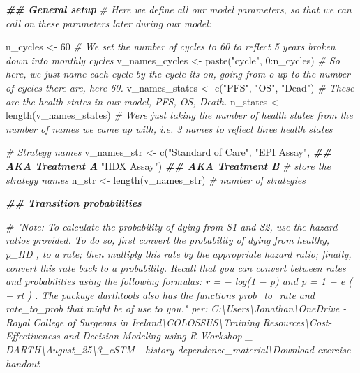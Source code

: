 \documentclass[
]{article}
\newenvironment{Shaded}{\begin{snugshade}}{\end{snugshade}}
\newcommand{\CommentTok}[1]{\textcolor[rgb]{0.56,0.35,0.01}{\textit{#1}}}
\newcommand{\DecValTok}[1]{\textcolor[rgb]{0.00,0.00,0.81}{#1}}
\newcommand{\DocumentationTok}[1]{\textcolor[rgb]{0.56,0.35,0.01}{\textbf{\textit{#1}}}}
\newcommand{\FunctionTok}[1]{\textcolor[rgb]{0.00,0.00,0.00}{#1}}
\newcommand{\NormalTok}[1]{#1}
\newcommand{\OtherTok}[1]{\textcolor[rgb]{0.56,0.35,0.01}{#1}}
\newcommand{\SpecialCharTok}[1]{\textcolor[rgb]{0.00,0.00,0.00}{#1}}
\newcommand{\StringTok}[1]{\textcolor[rgb]{0.31,0.60,0.02}{#1}}
\begin{document}
\begin{Shaded}
\begin{Highlighting}[]
\DocumentationTok{\#\# General setup}
\CommentTok{\# Here we define all our model parameters, so that we can call on these parameters later during our model:}

\NormalTok{n\_cycles        }\OtherTok{\textless{}{-}} \DecValTok{60}                            
\CommentTok{\# We set the number of cycles to 60 to reflect 5 years broken down into monthly cycles}
\NormalTok{v\_names\_cycles  }\OtherTok{\textless{}{-}} \FunctionTok{paste}\NormalTok{(}\StringTok{"cycle"}\NormalTok{, }\DecValTok{0}\SpecialCharTok{:}\NormalTok{n\_cycles)    }
\CommentTok{\# So here, we just name each cycle by the cycle its on, going from o up to the number of cycles there are, here 60.}
\NormalTok{v\_names\_states  }\OtherTok{\textless{}{-}} \FunctionTok{c}\NormalTok{(}\StringTok{"PFS"}\NormalTok{, }\StringTok{"OS"}\NormalTok{, }\StringTok{"Dead"}\NormalTok{)  }
\CommentTok{\# These are the health states in our model, PFS, OS, Death.}
\NormalTok{n\_states        }\OtherTok{\textless{}{-}} \FunctionTok{length}\NormalTok{(v\_names\_states)        }
\CommentTok{\# We\textquotesingle{}re just taking the number of health states from the number of names we came up with, i.e. 3 names to reflect three health states }

\CommentTok{\# Strategy names}
\NormalTok{v\_names\_str     }\OtherTok{\textless{}{-}} \FunctionTok{c}\NormalTok{(}\StringTok{"Standard of Care"}\NormalTok{,         }
                     \StringTok{"EPI Assay"}\NormalTok{, }\DocumentationTok{\#\# AKA Treatment A}
                     \StringTok{"HDX Assay"}\NormalTok{) }\DocumentationTok{\#\# AKA Treatment B }
\CommentTok{\# store the strategy names}
\NormalTok{n\_str           }\OtherTok{\textless{}{-}} \FunctionTok{length}\NormalTok{(v\_names\_str)           }
\CommentTok{\# number of strategies}


\DocumentationTok{\#\# Transition probabilities}


\CommentTok{\# "Note: To calculate the probability of dying from S1 and S2, use the hazard ratios provided. To do so, first convert the probability of dying from healthy, p\_HD , to a rate; then multiply this rate by the appropriate hazard ratio; finally, convert this rate back to a probability. Recall that you can convert between rates and probabilities using the following formulas: r = − log(1 − p) and p = 1 − e ( − rt ) . The package darthtools also has the functions prob\_to\_rate and rate\_to\_prob that might be of use to you." per: C:\textbackslash{}Users\textbackslash{}Jonathan\textbackslash{}OneDrive {-} Royal College of Surgeons in Ireland\textbackslash{}COLOSSUS\textbackslash{}Training Resources\textbackslash{}Cost{-}Effectiveness and Decision Modeling using R Workshop \_ DARTH\textbackslash{}August\_25\textbackslash{}3\_cSTM {-} history dependence\_material\textbackslash{}Download exercise handout }


\end{Highlighting}
\end{Shaded}
\end{document}
